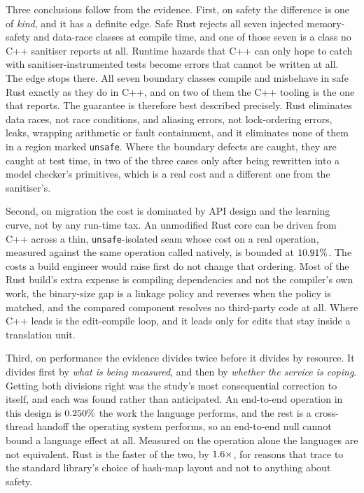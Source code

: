 \documentclass[english,oneside,a4paper,censored,csm,software-track-2020]{HYthesisML}
\begin{document}
Three conclusions follow from the evidence. First, on safety the difference is one of
\emph{kind}, and it has a definite edge. Safe Rust rejects all seven injected memory-safety and
data-race classes at compile time, and one of those seven is a class no C++ sanitiser reports at
all. Runtime hazards that C++ can only hope to catch with
sanitiser-instrumented tests become errors that cannot be written at all. The edge stops there.
All seven boundary
classes compile and misbehave in safe Rust exactly as they do in C++, and on two of them the C++
tooling is the one that reports. The guarantee is therefore best described precisely. Rust
eliminates data races, not race conditions, and aliasing errors, not lock-ordering errors,
leaks, wrapping arithmetic or fault containment, and it eliminates none of them in a region
marked \texttt{unsafe}. Where the boundary defects are caught, they are
caught at test time, in two of the three cases only after being rewritten into a model checker's
primitives, which is a real cost and a different one from the sanitiser's.

Second, on migration
the cost is dominated by API design and the learning curve, not by any run-time tax. An
unmodified Rust core can be driven from C++ across a thin, \texttt{unsafe}-isolated seam whose
cost on a real operation, measured against the same operation called natively, is bounded at
$10.91\%$. The costs a build engineer would raise first do not change that ordering.
Most of the Rust build's extra expense is compiling dependencies and not the compiler's own work,
the binary-size gap is a linkage policy and reverses when the policy is matched, and the compared
component resolves no third-party code at all. Where C++ leads is the edit-compile loop, and it
leads only for edits that stay inside a translation unit.

Third, on performance the evidence divides twice before it divides by resource. It divides first
by \emph{what is being measured}, and then by \emph{whether the service is coping}. Getting both
divisions right was the study's most consequential correction to itself, and each was found rather
than anticipated. An end-to-end operation in this design is $0.250\%$ the work the
language performs, and the rest is a cross-thread handoff the operating system performs, so an
end-to-end null cannot bound a language effect at all. Measured on the operation alone the
languages are not equivalent. Rust is the faster of the two, by $1.6\times$, for
reasons that trace to the standard library's choice of hash-map layout and not to anything
about safety.
\end{document}
